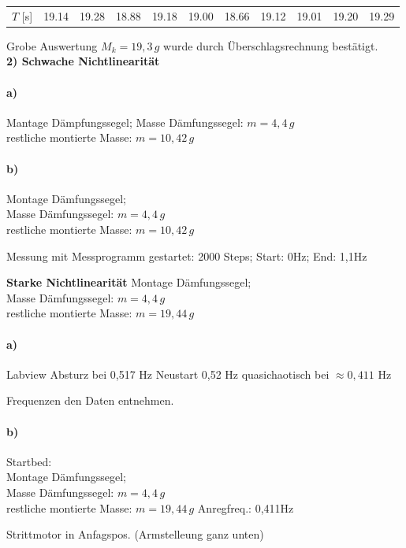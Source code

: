 \begin{tabular}{c | cccccccccc}
    $T$ [s]&19.14&19.28&18.88&19.18&19.00&18.66&19.12&19.01&19.20&19.29\\
\end{tabular}

Grobe Auswertung \(M_k = 19,3 \, g\) wurde durch Überschlagsrechnung bestätigt.\\

\textbf{2) Schwache Nichtlinearität}\\
\paragraph{a)}
Mantage Dämpfungssegel; Masse Dämfungssegel: \(m=4,4 \, g\)\\
restliche montierte Masse: \( m = 10,42 \,g \)

\paragraph{b)}
Montage Dämfungssegel;\\
Masse Dämfungssegel: \(m=4,4 \, g\)\\
restliche montierte Masse: \( m = 10,42 \,g \)

Messung mit Messprogramm gestartet: 2000 Steps; Start: 0Hz; End: 1,1Hz

\textbf{Starke Nichtlinearität}
Montage Dämfungssegel;\\
Masse Dämfungssegel: \(m=4,4 \, g\)\\
restliche montierte Masse: \( m = 19,44 \,g \)

\paragraph{a)}
Labview Absturz bei 0,517 Hz 
Neustart 0,52 Hz
quasichaotisch bei $\approx0,411$ Hz

Frequenzen den Daten entnehmen.

\paragraph{b)}
Startbed: \\
Montage Dämfungssegel;\\
Masse Dämfungssegel: \(m=4,4 \, g\)\\
restliche montierte Masse: \( m = 19,44 \,g \)
Anregfreq.: 0,411Hz

Strittmotor in Anfagspos. (Armstelleung ganz unten)


